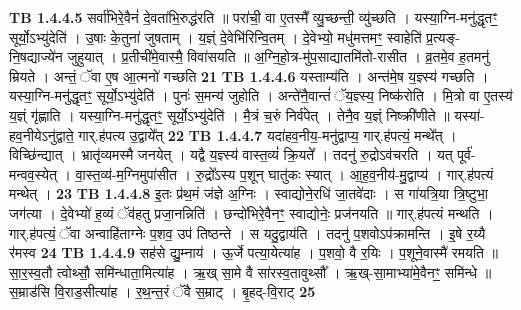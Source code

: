 \documentclass[17pt]{extarticle}
\begin{document}
                  \newline
                                \textbf{ TB 1.4.4.5} \newline
                  सर्वा॑भिरे॒वैनं॑ दे॒वता॑भि॒रुद्ध॑रति ॥ परा॑ची॒ वा ए॒तस्मै᳚ व्यु॒च्छन्ती॒ व्यु॑च्छति । यस्या॒ग्नि-मनु॑द्धृतꣳ॒॒ सूर्यो॒ऽभ्यु॑देति॑ । उ॒षाः के॒तुना॑ जुषताम् । य॒ज्ञ्ं दे॒वेभि॑रिन्वि॒तम् । दे॒वेभ्यो॒ मधु॑मत्तमꣳ॒॒ स्वाहेति॑ प्र॒त्यङ्-नि॒षद्याज्ये॑न जुहुयात् । प्र॒तीची॑मे॒वास्मै॒ विवा॑सयति ॥ अ॒ग्नि॒हो॒त्र-मु॑प॒साद्यातमि॑तो-रासीत । व्र॒तमे॒व ह॒तमनु॑ म्रियते । अन्तं॒ ॅवा ए॒ष आ॒त्मनो॑ गच्छति \textbf{ 21} \newline
                  \newline
                                \textbf{ TB 1.4.4.6} \newline
                  यस्ताम्य॑ति । अन्त॑मे॒ष य॒ज्ञ्स्य॑ गच्छति । यस्या॒ग्नि-मनु॑द्धृतꣳ॒॒ सूर्यो॒ऽभ्यु॑देति॑ । पुनः॑ स॒मन्य॑ जुहोति । अन्ते॑नै॒वान्तं॑ ॅय॒ज्ञ्स्य॒ निष्क॑रोति । मि॒त्रो वा ए॒तस्य॑ य॒ज्ञ्ं गृ॑ह्णाति । यस्या॒ग्नि-मनु॑द्धृतꣳ॒॒ सूर्यो॒ऽभ्यु॑देति॑ । मै॒त्रं च॒रुं निर्व॑पेत् । तेनै॒व य॒ज्ञ्ं निष्क्री॑णीते ॥ यस्या॑-हव॒नीयेऽनु॑द्वाते॒ गार्.ह॑पत्य उ॒द्वाये᳚त् \textbf{ 22} \newline
                  \newline
                                \textbf{ TB 1.4.4.7} \newline
                  यदा॑हव॒नीय॒-मनु॑द्वाप्य॒ गार्.ह॑पत्यं॒ मन्थे᳚त् । विच्छि॑न्द्यात् । भ्रातृ॑व्यमस्मै जनयेत् । यद्वै य॒ज्ञ्स्य॑ वास्त॒व्यं॑ क्रि॒यते᳚ । तदनु॑ रु॒द्रोऽव॑चरति । यत् पूर्व॑-मन्वव॒स्येत् । वा॒स्त॒व्य॑-म॒ग्निमुपा॑सीत । रु॒द्रो᳚ऽस्य प॒शून् घातु॑कः स्यात् । आ॒ह॒व॒नीय॑-मु॒द्वाप्य॑ । गार्.ह॑पत्यं मन्थेत् । \textbf{ 23} \newline
                  \newline
                                \textbf{ TB 1.4.4.8} \newline
                  इ॒तः प्र॑थ॒मं ज॑ज्ञे अ॒ग्निः । स्वाद्योने॒रधि॑ जा॒तवे॑दाः । स गा॑यत्रि॒या त्रि॒ष्टुभा॒ जग॑त्या । दे॒वेभ्यो॑ ह॒व्यं ॅव॑हतु प्रजा॒नन्निति॑ । छन्दो॑भिरे॒वैनꣳ॒॒ स्वाद्योनेः॒ प्रज॑नयति ॥ गार्.ह॑पत्यं मन्थति । गार्.ह॑पत्यं॒ ॅवा अन्वाहि॑ताग्नेः प॒शव॒ उप॑ तिष्ठन्ते । स यदु॒द्वाय॑ति । तदनु॑ प॒शवोऽप॑क्रामन्ति । इ॒षे र॒य्यै र॑मस्व \textbf{ 24} \newline
                  \newline
                                \textbf{ TB 1.4.4.9} \newline
                  सह॑से द्यु॒म्नाय॑ । ऊ॒र्जे पत्या॒येत्या॑ह । प॒शवो॒ वै र॒यिः । प॒शूने॒वास्मै॑ रमयति ॥ सा॒र॒स्व॒तौ त्वोथ्सौ॒ समि॑न्धाता॒मित्या॑ह । ऋ॒ख् सा॒मे वै सा॑रस्व॒तावुथ्सौ᳚ । ऋ॒ख्-सा॒माभ्या॑मे॒वैनꣳ॒॒ समि॑न्धे ॥ स॒म्राड॑सि वि॒राड॒सीत्या॑ह । र॒थ॒न्त॒रं ॅवै स॒म्राट् । बृ॒हद्-वि॒राट् \textbf{ 25} \newline
\end{document}
